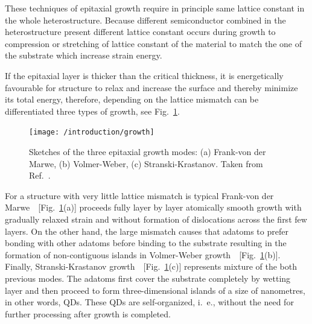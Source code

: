 \documentclass[
a4paper, %
11pt, %
onecolumn, %
openany, %
oldfontcommands,
]{memoir}
\begin{document}
These techniques of epitaxial growth require in principle same lattice constant in the whole heterostructure. Because different semiconductor combined in the heterostructure present different lattice constant occurs during growth to compression or stretching of lattice constant of the material to match the one of the substrate which increase strain energy. %

 
If the epitaxial layer is thicker than the critical thickness, it is energetically favourable for structure to relax and increase the surface and thereby minimize its total energy, therefore, depending on the lattice mismatch %
can be differentiated three types of growth, see Fig.~\ref{fig:intr:growth}.
%
\begin{figure}
	\centering
	\texttt{[image: /introduction/growth]}
	\caption{Sketches of the three epitaxial growth modes: (a) Frank-von der Marwe, (b) Volmer-Weber, (c) Stranski-Krastanov. Taken from Ref.~\cite{t_bonato}.}
	\label{fig:intr:growth}
\end{figure}
%
For a structure with very little lattice mismatch is typical Frank-von der Marwe~\cite{Frank-Merwe}~[Fig.~\ref{fig:intr:growth}(a)] proceeds fully layer by layer atomically smooth growth with gradually relaxed strain and without formation of dislocations across the first few layers. On the other hand, the large mismatch causes that adatoms to prefer bonding with other adatoms before binding to the substrate resulting in the formation of non-contiguous islands in Volmer-Weber growth~\cite{Volmer-Weber}~[Fig.~\ref{fig:intr:growth}(b)]. Finally, Stranski-Krastanov growth~\cite{Stranski1937}~[Fig.~\ref{fig:intr:growth}(c)] represents mixture of the both previous modes. The adatoms first cover the substrate completely by wetting layer and then proceed to form three-dimensional islands of a size of nanometres, in other words, QDs. These QDs are self-organized, i.~e., without the need for further processing after growth is completed.
\end{document}
